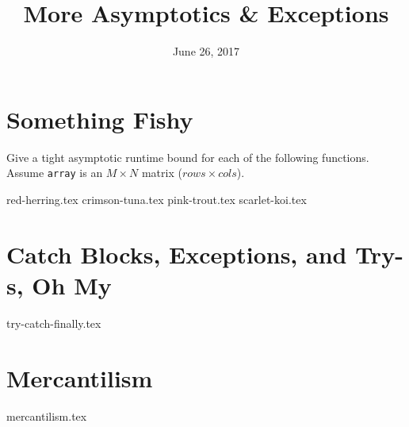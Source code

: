 \documentclass{exam}
\title{More Asymptotics \& Exceptions}
\date{June 26, 2017}
\begin{document}
\maketitle

\section{Something Fishy}
Give a tight asymptotic runtime bound for each of the following functions. Assume \texttt{array} is an $M \times N$ matrix ($rows \times cols$).
\begin{questions}
{red-herring.tex}
{crimson-tuna.tex}
{pink-trout.tex}
{scarlet-koi.tex}
\end{questions}

\clearpage

\section{Catch Blocks, Exceptions, and Try-s, Oh My}
\begin{questions}
{try-catch-finally.tex}
\end{questions}

\clearpage

\section{Mercantilism}
\begin{questions}
{mercantilism.tex}
\end{questions}
\end{document}
